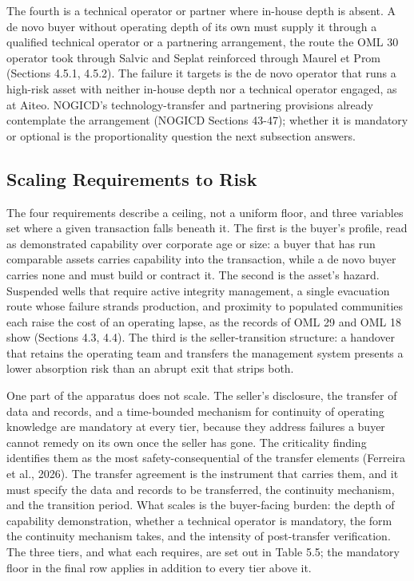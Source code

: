 \documentclass[twoside,fontset=lmodern]{mitthesis}
\begin{document}
The fourth is a technical operator or partner where in-house depth is
absent. A de novo buyer without operating depth of its own must supply
it through a qualified technical operator or a partnering arrangement,
the route the OML 30 operator took through Salvic and Seplat reinforced
through Maurel et Prom (Sections 4.5.1, 4.5.2). The failure it targets
is the de novo operator that runs a high-risk asset with neither
in-house depth nor a technical operator engaged, as at Aiteo. NOGICD's
technology-transfer and partnering provisions already contemplate the
arrangement (NOGICD Sections 43-47); whether it is mandatory or optional
is the proportionality question the next subsection answers.

\hypertarget{scaling-requirements-to-risk}{%
\subsection{Scaling Requirements to
Risk}\label{scaling-requirements-to-risk}}

The four requirements describe a ceiling, not a uniform floor, and three
variables set where a given transaction falls beneath it. The first is
the buyer's profile, read as demonstrated capability over corporate age
or size: a buyer that has run comparable assets carries capability into
the transaction, while a de novo buyer carries none and must build or
contract it. The second is the asset's hazard. Suspended wells that
require active integrity management, a single evacuation route whose
failure strands production, and proximity to populated communities each
raise the cost of an operating lapse, as the records of OML 29 and OML
18 show (Sections 4.3, 4.4). The third is the seller-transition
structure: a handover that retains the operating team and transfers the
management system presents a lower absorption risk than an abrupt exit
that strips both.

One part of the apparatus does not scale. The seller's disclosure, the
transfer of data and records, and a time-bounded mechanism for
continuity of operating knowledge are mandatory at every tier, because
they address failures a buyer cannot remedy on its own once the seller
has gone. The criticality finding identifies them as the most
safety-consequential of the transfer elements (Ferreira et al., 2026).
The transfer agreement is the instrument that carries them, and it must
specify the data and records to be transferred, the continuity
mechanism, and the transition period. What scales is the buyer-facing
burden: the depth of capability demonstration, whether a technical
operator is mandatory, the form the continuity mechanism takes, and the
intensity of post-transfer verification. The three tiers, and what each
requires, are set out in Table 5.5; the mandatory floor in the final row
applies in addition to every tier above it.
\end{document}

